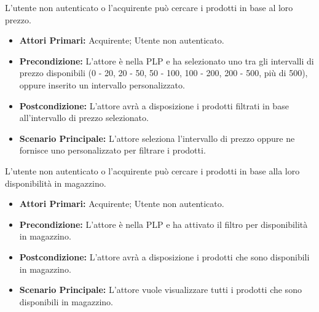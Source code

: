 L'utente non autenticato o l'acquirente può cercare i prodotti in base al loro prezzo.
\begin{itemize}
    \item \textbf{Attori Primari:} Acquirente; Utente non autenticato.
    \item \textbf{Precondizione:} L'attore è nella PLP e ha selezionato uno tra gli intervalli di prezzo disponibili (0 - 20, 20 - 50, 50 - 100, 100 - 200, 200 - 500, più di 500), oppure inserito un intervallo personalizzato.
    \item \textbf{Postcondizione:} L'attore avrà a disposizione i prodotti filtrati in base all'intervallo di prezzo selezionato.
    \item \textbf{Scenario Principale:} L'attore seleziona l'intervallo di prezzo oppure ne fornisce uno personalizzato per filtrare i prodotti.
\end{itemize}

L'utente non autenticato o l'acquirente può cercare i prodotti in base alla loro disponibilità in magazzino.
\begin{itemize}
    \item \textbf{Attori Primari:} Acquirente; Utente non autenticato.
    \item \textbf{Precondizione:} L'attore è nella PLP e ha attivato il filtro per disponibilità in magazzino.
    \item \textbf{Postcondizione:} L'attore avrà a disposizione i prodotti che sono disponibili in magazzino.
    \item \textbf{Scenario Principale:} L'attore vuole visualizzare tutti i prodotti che sono disponibili in magazzino.
\end{itemize}
